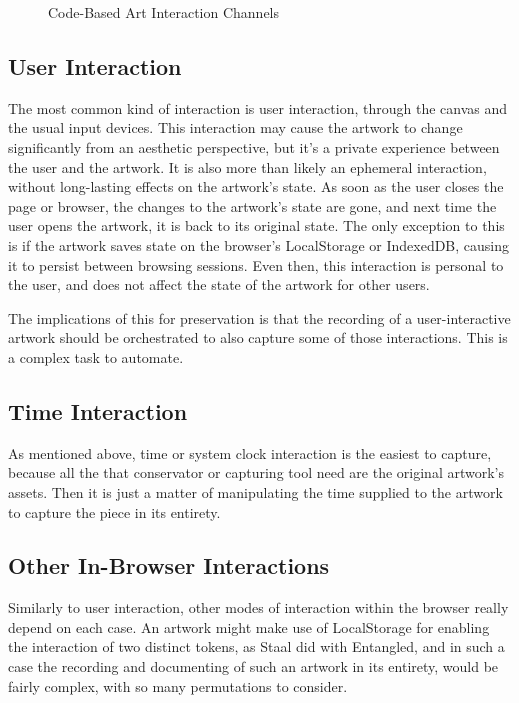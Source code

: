 \begin{figure}[h]
    \centering
    \captionsetup{justification=centering}
    
    \caption[Code-Based Art Interaction Channels]{Code-Based Art Interaction Channels}
    \label{fig:code-based-art-interactions}
\end{figure}

\subsection{User Interaction}

The most common kind of interaction is user interaction, through the canvas and the usual input devices. This interaction may cause the artwork to change significantly from an aesthetic perspective, but it's a private experience between the user and the artwork. It is also more than likely an ephemeral interaction, without long-lasting effects on the artwork's state. As soon as the user closes the page or browser, the changes to the artwork's state are gone, and next time the user opens the artwork, it is back to its original state. The only exception to this is if the artwork saves state on the browser's LocalStorage or IndexedDB, causing it to persist between browsing sessions. Even then, this interaction is personal to the user, and does not affect the state of the artwork for other users.

The implications of this for preservation is that the recording of a user-interactive artwork should be orchestrated to also capture some of those interactions. This is a complex task to automate.

\subsection{Time Interaction}

As mentioned above, time or system clock interaction is the easiest to capture, because all the that conservator or capturing tool need are the original artwork's assets. Then it is just a matter of manipulating the time supplied to the artwork to capture the piece in its entirety.

\subsection{Other In-Browser Interactions}

Similarly to user interaction, other modes of interaction within the browser really depend on each case. An artwork might make use of LocalStorage for enabling the interaction of two distinct tokens, as Staal did with Entangled, and in such a case the recording and documenting of such an artwork in its entirety, would be fairly complex, with so many permutations to consider.

